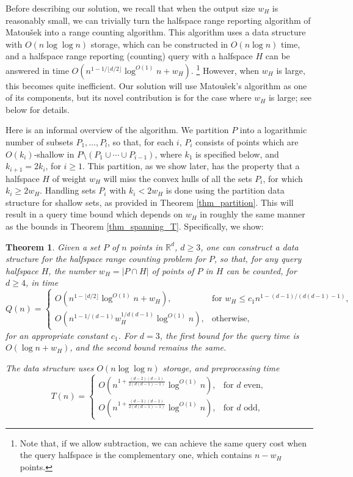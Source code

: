 \documentclass[11pt]{article}
\newtheorem{theorem}{Theorem}[section]
\def\reals{\mathbb R}
\begin{document}
Before describing our solution, we recall that when the output size $w_{H}$ is reasonably small, we can trivially turn the halfspace range reporting algorithm of Matou\v{s}ek \cite{mat92b} into a range counting algorithm. This algorithm uses a data structure with $O(n \log \log n)$ storage, which can be constructed in $O(n \log n)$ time, and a halfspace range reporting (counting) query with a halfspace $H$ can be answered in time $O(n^{1-1/\lfloor d/2 \rfloor} \log^{O(1)}n + w_{H})$. \footnote{Note that, if we allow subtraction, we can achieve the same query cost when the query halfspace is the complementary one, which contains $n - w_{H}$ points.} However, when $w_{H}$ is large, this becomes quite inefficient. Our solution will use Matou\v{s}ek's algorithm as one of its components, but its novel contribution is for the case where $w_{H}$ is large; see below for details.

Here is an informal overview of the algorithm. We partition $P$ into a logarithmic number of subsets $P_{1}, \ldots , P_{l}$, so that, for each $i$, $P_{i}$ consists of points which are $O(k_{i})$-shallow in $P \setminus (P_{1} \cup \cdots \cup P_{i-1})$, where $k_{1}$ is specified below, and $k_{i+1} = 2k_{i}$, for $i \geq 1$. This partition, as we show later, has the property that a halfspace $H$ of weight $w_{H}$ will miss the convex hulls of all the sets $P_{i}$, for which $k_{i} \geq 2 w_{H}$. Handling sets $P_{i}$ with $k_{i} < 2w_{H}$ is done using the partition data structure for shallow sets, as provided in Theorem \ref{thm_partition}. This will result in a query time bound which depends on $w_{H}$ in roughly the same manner as the bounds in Theorem \ref{thm_spanning_T}. Specifically, we show:

\begin{theorem} \label{thm_range_counting}
Given a set $P$ of $n$ points in $\reals^{d}$, $d \geq 3$, one can construct a data structure for the halfspace range counting problem for $P$, so that, for any query halfspace $H$, the number $w_{H} = |P \cap H|$ of points of $P$ in $H$ can be counted, for $d \geq 4$, in time
\begin{equation} \label{eq_range_counting_time}
Q(n) =
\begin{cases}
    O\left(n^{1-\lfloor d/2 \rfloor} \log^{O(1)}n + w_{H}\right), & \mbox{for $w_{H} \leq c_{1} n^{1-(d-1)/(d(d-1)-1)}$}, \\
    O\left(n^{1-1/(d-1)} w_{H}^{1/d(d-1)} \log^{O(1)}n \right), & \mbox{otherwise},
\end{cases}
\end{equation}
for an appropriate constant $c_{1}$. For $d = 3$, the first bound for the query time is $O(\log n + w_{H})$, and the second bound remains the same.

The data structure uses $O(n\log\log n)$ storage, and preprocessing time
$$
T(n) =
\begin{cases}
    O\left(n^{1 + \frac{(d-2)(d-1)}{2(d(d-1)-1)}} \log^{O(1)}n  \right), & \mbox{for $d$ even}, \\
    O\left(n^{1 + \frac{(d-3)(d-1)}{2(d(d-1)-1)}}\log^{O(1)}n  \right), & \mbox{for $d$ odd},
\end{cases}
$$
\end{theorem}
\end{document}
